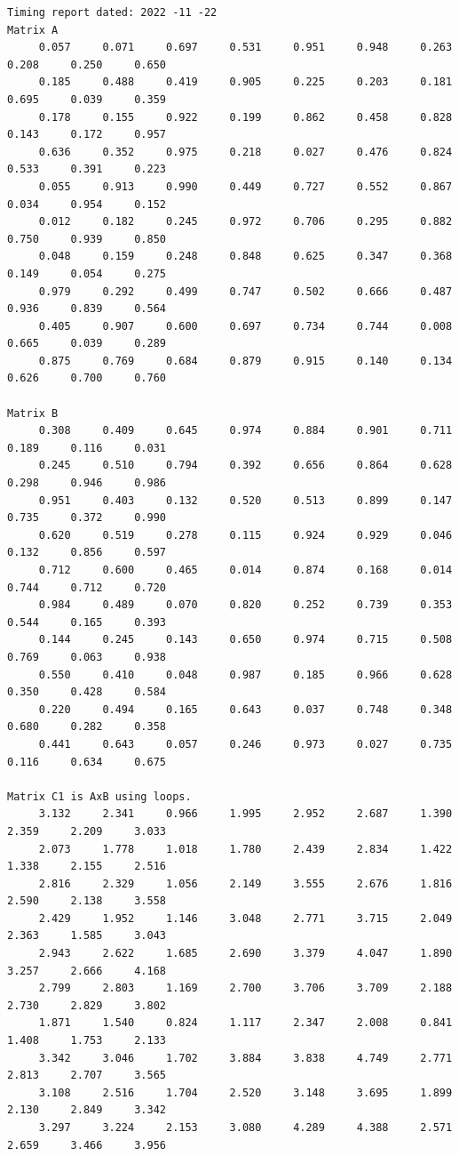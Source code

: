 \begin{verbatim}
Timing report dated: 2022 -11 -22
Matrix A
     0.057     0.071     0.697     0.531     0.951     0.948     0.263     0.208     0.250     0.650
     0.185     0.488     0.419     0.905     0.225     0.203     0.181     0.695     0.039     0.359
     0.178     0.155     0.922     0.199     0.862     0.458     0.828     0.143     0.172     0.957
     0.636     0.352     0.975     0.218     0.027     0.476     0.824     0.533     0.391     0.223
     0.055     0.913     0.990     0.449     0.727     0.552     0.867     0.034     0.954     0.152
     0.012     0.182     0.245     0.972     0.706     0.295     0.882     0.750     0.939     0.850
     0.048     0.159     0.248     0.848     0.625     0.347     0.368     0.149     0.054     0.275
     0.979     0.292     0.499     0.747     0.502     0.666     0.487     0.936     0.839     0.564
     0.405     0.907     0.600     0.697     0.734     0.744     0.008     0.665     0.039     0.289
     0.875     0.769     0.684     0.879     0.915     0.140     0.134     0.626     0.700     0.760

Matrix B
     0.308     0.409     0.645     0.974     0.884     0.901     0.711     0.189     0.116     0.031
     0.245     0.510     0.794     0.392     0.656     0.864     0.628     0.298     0.946     0.986
     0.951     0.403     0.132     0.520     0.513     0.899     0.147     0.735     0.372     0.990
     0.620     0.519     0.278     0.115     0.924     0.929     0.046     0.132     0.856     0.597
     0.712     0.600     0.465     0.014     0.874     0.168     0.014     0.744     0.712     0.720
     0.984     0.489     0.070     0.820     0.252     0.739     0.353     0.544     0.165     0.393
     0.144     0.245     0.143     0.650     0.974     0.715     0.508     0.769     0.063     0.938
     0.550     0.410     0.048     0.987     0.185     0.966     0.628     0.350     0.428     0.584
     0.220     0.494     0.165     0.643     0.037     0.748     0.348     0.680     0.282     0.358
     0.441     0.643     0.057     0.246     0.973     0.027     0.735     0.116     0.634     0.675

Matrix C1 is AxB using loops.
     3.132     2.341     0.966     1.995     2.952     2.687     1.390     2.359     2.209     3.033
     2.073     1.778     1.018     1.780     2.439     2.834     1.422     1.338     2.155     2.516
     2.816     2.329     1.056     2.149     3.555     2.676     1.816     2.590     2.138     3.558
     2.429     1.952     1.146     3.048     2.771     3.715     2.049     2.363     1.585     3.043
     2.943     2.622     1.685     2.690     3.379     4.047     1.890     3.257     2.666     4.168
     2.799     2.803     1.169     2.700     3.706     3.709     2.188     2.730     2.829     3.802
     1.871     1.540     0.824     1.117     2.347     2.008     0.841     1.408     1.753     2.133
     3.342     3.046     1.702     3.884     3.838     4.749     2.771     2.813     2.707     3.565
     3.108     2.516     1.704     2.520     3.148     3.695     1.899     2.130     2.849     3.342
     3.297     3.224     2.153     3.080     4.289     4.388     2.571     2.659     3.466     3.956


\end{verbatim}
